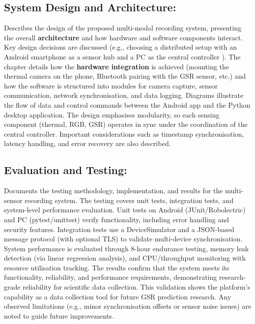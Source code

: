\subsection{System Design and Architecture:} Describes the design of the proposed multi-modal recording system, presenting the overall \textbf{architecture} and how hardware and software components interact. Key design decisions are discussed (e.g., choosing a distributed setup with an Android smartphone as a sensor hub and a PC as the central controller \cite{ref9}). The chapter details how the \textbf{hardware integration} is achieved (mounting the thermal camera on the phone, Bluetooth pairing with the GSR sensor, etc.) and how the software is structured into modules for camera capture, sensor communication, network synchronisation, and data logging. Diagrams illustrate the flow of data and control commands between the Android app and the Python desktop application. The design emphasises modularity, so each sensing component (thermal, RGB, GSR) operates in sync under the coordination of the central controller. Important considerations such as timestamp synchronisation, latency handling, and error recovery are also described.

\subsection{Evaluation and Testing:} Documents the testing methodology, implementation, and results for the multi-sensor recording system. The testing covers unit tests, integration tests, and system-level performance evaluation. Unit tests on Android (JUnit/Robolectric) and PC (pytest/unittest) verify functionality, including error handling and security features. Integration tests use a DeviceSimulator and a JSON-based message protocol (with optional TLS) to validate multi-device synchronisation. System performance is evaluated through 8-hour endurance testing, memory leak detection (via linear regression analysis), and CPU/throughput monitoring with resource utilisation tracking. The results confirm that the system meets its functionality, reliability, and performance requirements, demonstrating research-grade reliability for scientific data collection. This validation shows the platform's capability as a data collection tool for future GSR prediction research. Any observed limitations (e.g., minor synchronisation offsets or sensor noise issues) are noted to guide future improvements.

